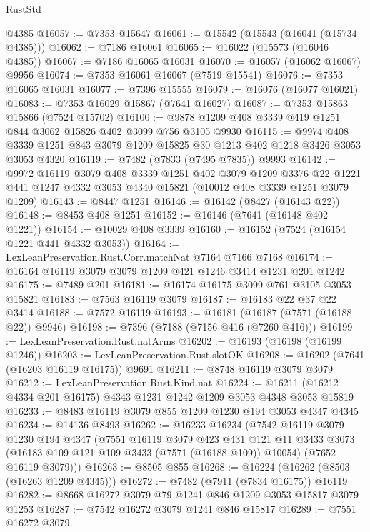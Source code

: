 \begin{lexlean}{RustStd}
\begin{coremodule}
    @4385
@16057 := @7353 @15647
@16061 := @15542 (@15543 (@16041 (@15734 @4385)))
@16062 := @7186 @16061
@16065 := @16022 (@15573 (@16046 @4385))
@16067 := @7186 @16065 @16031
@16070 := @16057 (@16062 @16067) @9956
@16074 := @7353 @16061 @16067 (@7519 @15541)
@16076 := @7353 @16065 @16031
@16077 := @7396 @15555
@16079 := @16076 (@16077 @16021)
@16083 := @7353 @16029 @15867 (@7641 @16027)
@16087 := @7353 @15863 @15866 (@7524 @15702)
@16100 := @9878 @1209 @408 @3339 @419 @1251 @844 @3062 @15826 @402 @3099 @756 @3105 @9930
@16115 := @9974
    @408
    @3339
    @1251
    @843
    @3079
    @1209
    @15825
    @30
    @1213
    @402
    @1218
    @3426
    @3053
    @3053
    @4320
@16119 := @7482 (@7833 (@7495 @7835)) @9993
@16142 := @9972
    @16119
    @3079
    @408
    @3339
    @1251
    @402
    @3079
    @1209
    @3376
    @22
    @1221
    @441
    @1247
    @4332
    @3053
    @4340
    @15821
    (@10012 @408 @3339 @1251 @3079 @1209)
@16143 := @8447 @1251
@16146 := @16142 (@8427 (@16143 @22))
@16148 := @8453 @408 @1251
@16152 := @16146 (@7641 (@16148 @402 @1221))
@16154 := @10029 @408 @3339
@16160 := @16152 (@7524 (@16154 @1221 @441 @4332 @3053))
@16164 := LexLeanPreservation.Rust.Corr.matchNat @7164 @7166 @7168
@16174 := @16164 @16119 @3079 @3079 @1209 @421 @1246 @3414 @1231 @201 @1242
@16175 := @7489 @201
@16181 := @16174 @16175 @3099 @761 @3105 @3053 @15821
@16183 := @7563 @16119 @3079
@16187 := @16183 @22 @37 @22 @3414
@16188 := @7572 @16119
@16193 := @16181 (@16187 (@7571 (@16188 @22)) @9946)
@16198 := @7396 (@7188 (@7156 @416 (@7260 @416)))
@16199 := LexLeanPreservation.Rust.natArms
@16202 := @16193 (@16198 (@16199 @1246))
@16203 := LexLeanPreservation.Rust.slotOK
@16208 := @16202 (@7641 (@16203 @16119 @16175)) @9691
@16211 := @8748 @16119 @3079 @3079
@16212 := LexLeanPreservation.Rust.Kind.nat
@16224 := @16211 (@16212 @4334 @201 @16175) @4343 @1231 @1242 @1209 @3053 @4348 @3053 @15819
@16233 := @8483 @16119 @3079 @855 @1209 @1230 @194 @3053 @4347 @4345
@16234 := @14136 @8493
@16262 := @16233
    @16234
    (@7542
      @16119
      @3079
      @1230
      @194
      @4347
      (@7551
        @16119
        @3079
        @423
        @431
        @121
        @11
        @3433
        @3073
        (@16183 @109 @121 @109 @3433 (@7571 (@16188 @109)) @10054)
        (@7652 @16119 @3079)))
@16263 := @8505 @855
@16268 := @16224 (@16262 (@8503 (@16263 @1209 @4345)))
@16272 := @7482 (@7911 (@7834 @16175)) @16119
@16282 := @8668 @16272 @3079 @79 @1241 @846 @1209 @3053 @15817 @3079 @1253
@16287 := @7542 @16272 @3079 @1241 @846 @15817
@16289 := @7551 @16272 @3079

\end{coremodule}
\end{lexlean}

